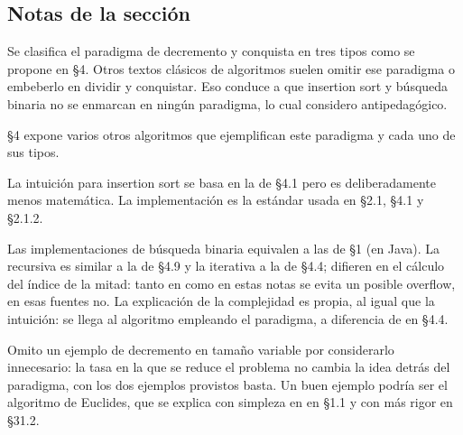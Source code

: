 \subsection*{Notas de la sección}

Se clasifica el paradigma de decremento y conquista en tres tipos como se propone en \textcite{levitin} \S 4. Otros textos clásicos de algoritmos suelen omitir ese paradigma o embeberlo en dividir y conquistar. Eso conduce a que insertion sort y búsqueda binaria no se enmarcan en ningún paradigma, lo cual considero antipedagógico.

\textcite{levitin} \S 4 expone varios otros algoritmos que ejemplifican este paradigma y cada uno de sus tipos.

La intuición para insertion sort se basa en la de \textcite{levitin} \S 4.1 pero es deliberadamente menos matemática. La implementación es la estándar usada en \textcite{cormen} \S 2.1, \textcite{levitin} \S 4.1 y \textcite{cardoso} \S 2.1.2.

Las implementaciones de búsqueda binaria equivalen a las de \textcite{sedgewick} \S 1 (en Java). La recursiva es similar a la de \textcite{skiena} \S 4.9 y la iterativa a la de \textcite{levitin} \S 4.4; difieren en el cálculo del índice de la mitad: tanto en \textcite{sedgewick} como en estas notas se evita un posible overflow, en esas fuentes no. La explicación de la complejidad es propia, al igual que la intuición: se llega al algoritmo empleando el paradigma, a diferencia de en \textcite{levitin} \S 4.4.

Omito un ejemplo de decremento en tamaño variable por considerarlo innecesario: la tasa en la que se reduce el problema no cambia la idea detrás del paradigma, con los dos ejemplos provistos basta. Un buen ejemplo podría ser el algoritmo de Euclides, que se explica con simpleza en en \textcite{levitin} \S 1.1 y con más rigor en \textcite{cormen2022} \S 31.2.
